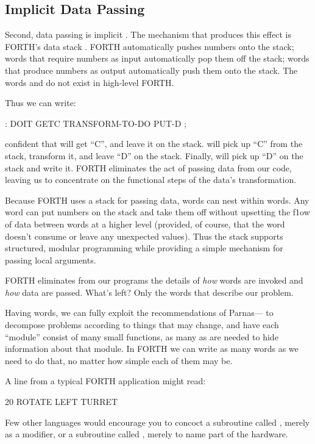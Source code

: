 \subsection{Implicit Data Passing}
Second, data passing is implicit
.
The mechanism that produces this effect is FORTH's data stack
.
FORTH automatically pushes numbers onto the stack; words that require
numbers as input automatically pop them off the stack; words that
produce numbers as output automatically push them onto the stack. The
words  and  do not exist in high-level FORTH.

Thus we can write:
\begin{Code}
: DOIT
    GETC  TRANSFORM-TO-DO  PUT-D ;
\end{Code}
confident that  will get ``C'', and leave it on the stack.
 will pick up ``C'' from the stack, transform
it, and leave ``D'' on the stack. Finally,  will pick up
``D'' on the stack and write it. FORTH eliminates the act of passing
data from our code, leaving us to concentrate on the functional steps
of the data's transformation.

Because FORTH uses a stack for passing data, words can nest within
words. Any word can put numbers on the stack and take them off without
upsetting the f1ow of data between words at a higher level (provided,
of course, that the word doesn't consume or leave any unexpected
values).  Thus the stack supports structured, modular programming
while providing a simple mechanism for passing local arguments.

FORTH eliminates from our programs the details of \emph{how} words are
invoked and \emph{how} data are passed. What's left? Only the words
that describe our problem.

Having words, we can fully exploit the recommendations of Parnas---
to decompose problems according to things that may change, and have
each ``module'' consist of many small functions, as many as are needed
to hide information about that module. In FORTH we can write as many
words as we need to do that, no matter how simple each of them may be.

A line from a typical FORTH application might read:
\begin{Code}
20 ROTATE LEFT TURRET
\end{Code}
Few other languages would encourage you to concoct a subroutine called
, merely as a modifier, or a subroutine called
, merely to name part of the hardware.

